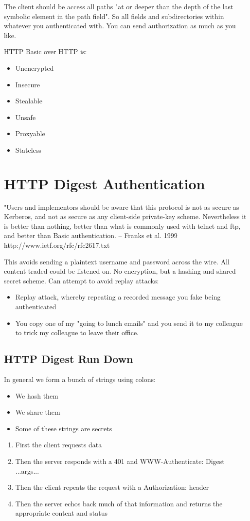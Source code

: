 \documentclass[../CMPUT-404-Notes.tex]{subfiles}
\begin{document}
The client should be access all paths "at or deeper than the depth of the last symbolic element in the path field". So all fields and subdirectories within whatever you authenticated with.
You can send authorization as much as you like.

HTTP Basic over HTTP is:
\begin{itemize}
  \item Unencrypted
  \item Insecure
  \item Stealable
  \item Unsafe
  \item Proxyable
  \item Stateless
\end{itemize}

\newpage

\section{HTTP Digest Authentication}
\begin{DndReadAloud}[color=bgtan]
  "Users and implementors should be aware that
this protocol is not as secure as Kerberos, and
not as secure as any client-side private-key
scheme. Nevertheless it is better than nothing,
better than what is commonly used with telnet
and ftp, and better than Basic authentication.
-- Franks et al. 1999
http://www.ietf.org/rfc/rfc2617.txt
\end{DndReadAloud}

This avoids sending a plaintext username and password across the wire.
All content traded could be listened on.
No encryption, but a hashing and shared secret scheme.
Can attempt to avoid replay attacks:
\begin{itemize}
  \item Replay attack, whereby repeating a recorded message you fake being authenticated
  \item You copy one of my "going to lunch emails" and you send it to my colleague to trick my colleague to leave their office.
\end{itemize}

\subsection{HTTP Digest Run Down}
In general we form a bunch of strings using colons:
\begin{itemize}
  \item We hash them
  \item We share them
  \item Some of these strings are secrets
\end{itemize}
\begin{enumerate}
  \item First the client requests data
  \item Then the server responds with a 401 and WWW-Authenticate: Digest ...args...
  \item Then the client repeats the request with a Authorization: header
  \item Then the server echos back much of that information and returns the appropriate content and status
\end{enumerate}
\end{document}
